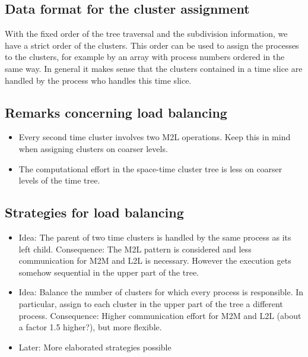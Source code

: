 \documentclass[a4paper,11pt]{article}
\theoremstyle{plain}
\theoremstyle{definition}
\theoremstyle{remark}
\begin{document}

\subsection{Data format for the cluster assignment}

With the fixed order of the tree traversal and the subdivision information, we have a strict order of the clusters. This order can be used to assign the processes to the clusters, for example by an array with process numbers ordered in the same way. In general it makes sense that the clusters contained in a time slice are handled by the process who handles this time slice.

\subsection{Remarks concerning load balancing}
\begin{itemize}
  \item Every second time cluster involves two M2L operations. Keep this in mind when assigning clusters on coarser 
  levels.
  \item The computational effort in the space-time cluster tree is less on coarser levels of the time tree.
\end{itemize}

\subsection{Strategies for load balancing}

\begin{itemize}
  \item Idea: The parent of two time clusters is handled by the same process as its left child. Consequence: The 
  M2L pattern is considered and less communication for M2M and L2L is necessary. However the execution gets 
  somehow sequential in the upper part of the tree.
  \item Idea: Balance the number of clusters for which every process is responsible. In particular, assign to 
  each cluster in the upper part of the tree a different process. Consequence: Higher communication effort for 
  M2M and L2L (about a factor 1.5 higher?), but more flexible.
  \item Later: More elaborated strategies possible
\end{itemize}
\end{document}
